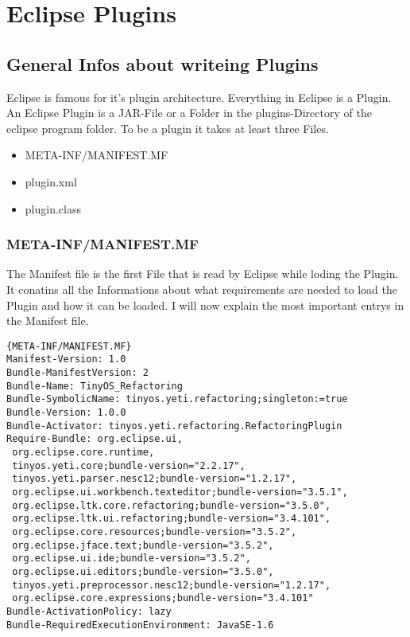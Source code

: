 \documentclass[a4paper,10pt]{report}
\begin{document}
\part{Eclipse Plugins}
\chapter{General Infos about writeing Plugins}
Eclipse is famous for it's plugin architecture. Everything in Eclipse is a Plugin. An Eclipse Plugin is a JAR-File or a Folder in the plugins-Directory of the eclipse program folder.
To be a plugin it takes at least three Files.
\begin{itemize}
  \item META-INF/MANIFEST.MF
  \item plugin.xml
  \item plugin.class
\end{itemize}

\section{META-INF/MANIFEST.MF}
The Manifest file is the first File that is read by Eclipse while loding the Plugin. It conatins all the Informations about what requirements 
are needed to load the Plugin and how it can be loaded. I will now explain the most important entrys in the Manifest file.

\begin{lstlisting}[caption=MANIFEST]{META-INF/MANIFEST.MF}
Manifest-Version: 1.0
Bundle-ManifestVersion: 2
Bundle-Name: TinyOS_Refactoring
Bundle-SymbolicName: tinyos.yeti.refactoring;singleton:=true
Bundle-Version: 1.0.0
Bundle-Activator: tinyos.yeti.refactoring.RefactoringPlugin
Require-Bundle: org.eclipse.ui,
 org.eclipse.core.runtime,
 tinyos.yeti.core;bundle-version="2.2.17",
 tinyos.yeti.parser.nesc12;bundle-version="1.2.17",
 org.eclipse.ui.workbench.texteditor;bundle-version="3.5.1",
 org.eclipse.ltk.core.refactoring;bundle-version="3.5.0",
 org.eclipse.ltk.ui.refactoring;bundle-version="3.4.101",
 org.eclipse.core.resources;bundle-version="3.5.2",
 org.eclipse.jface.text;bundle-version="3.5.2",
 org.eclipse.ui.ide;bundle-version="3.5.2",
 org.eclipse.ui.editors;bundle-version="3.5.0",
 tinyos.yeti.preprocessor.nesc12;bundle-version="1.2.17",
 org.eclipse.core.expressions;bundle-version="3.4.101"
Bundle-ActivationPolicy: lazy
Bundle-RequiredExecutionEnvironment: JavaSE-1.6
\end{lstlisting}
\end{document}
